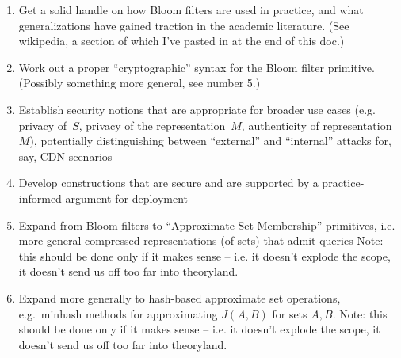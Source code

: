 \begin{enumerate}
\item Get a solid handle on how Bloom filters are used in practice, and what generalizations have gained traction in the academic literature. (See wikipedia, a section of which I've pasted in at the end of this doc.)
\item Work out a proper “cryptographic” syntax for the Bloom filter primitive.  (Possibly something more general, see number 5.)
\item Establish security notions that are appropriate for broader use cases (e.g. privacy of~$S$, privacy of the representation~$M$, authenticity of representation~$M$), potentially distinguishing between “external” and “internal” attacks for, say, CDN scenarios
\item Develop constructions that are secure and are supported by a practice-informed argument for deployment
\item Expand from Bloom filters to “Approximate Set Membership” primitives, i.e. more general compressed representations (of sets) that admit queries  Note: this should be done only if it makes sense -- i.e. it doesn't explode the scope, it doesn't send us off too far into theoryland.
\item Expand more generally to hash-based approximate set operations, e.g.\ minhash methods for approximating $J(A,B)$ for sets $A,B$.  Note: this should be done only if it makes sense -- i.e. it doesn't explode the scope, it doesn't send us off too far into theoryland.
\end{enumerate}



